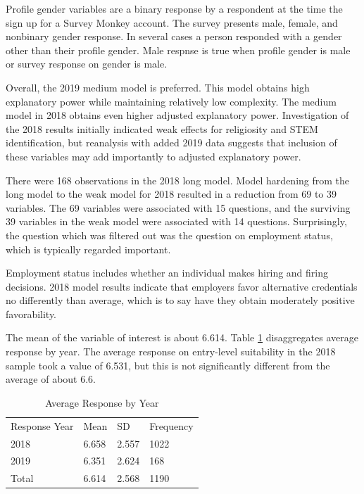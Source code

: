 \documentclass[AER]{./aea-latex-templates/AEA}
\begin{document}
Profile gender variables are a binary response by a respondent at the time the sign up for a Survey Monkey account.
The survey presents male, female, and nonbinary gender response. In several cases a person responded with a gender other than their profile gender.
Male respnse is true when profile gender is male or survey response on gender is male.

Overall, the 2019 medium model is preferred. This model obtains high explanatory power while maintaining relatively low complexity.
The medium model in 2018 obtains even higher adjusted explanatory power.
Investigation of the 2018 results initially indicated weak effects for religiosity and STEM identification,
but reanalysis with added 2019 data suggests that inclusion of these variables may add importantly to adjusted explanatory power.

There were 168 observations in the 2018 long model. Model hardening from
the long model to the weak model for 2018 resulted in a reduction from 69
to 39 variables. The 69 variables were associated with 15 questions, and
the surviving 39 variables in the weak model were associated with 14
questions. Surprisingly, the question which was filtered out
was the question on employment status, which is typically regarded important.

Employment status includes whether an individual makes hiring and firing decisions.
2018 model results indicate that employers favor alternative credentials
no differently than average, which is to say have they obtain moderately positive favorability.

The mean of the variable of interest is about 6.614.
Table \ref{tab:voi_by_is2018response} disaggregates average response by year.
The average response on entry-level suitability in the 2018
sample took a value of 6.531, but this is not significantly different
from the average of about 6.6.

\begin{table}
    \caption{Average Response by Year}
    \begin{tabular}{llll}
        Response Year & Mean & SD & Frequency \\
        2018 & 6.658 & 2.557 & 1022 \\
        2019 & 6.351 & 2.624 & 168 \\
        Total & 6.614 & 2.568 & 1190 %
    \end{tabular}
    \label{tab:voi_by_is2018response}
    \end{table}
\end{document}
